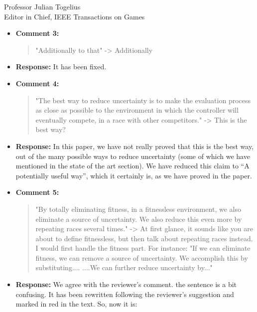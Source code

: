 \documentclass[10pt]{letter} %
\begin{document}
\begin{letter}{Professor Julian Togelius \\ Editor in Chief, IEEE Transactions on Games}
\begin{enumerate}
\begin{itemize}
	
		\item {\bf Comment 3:}
			\begin{quote}
				"Additionally to that" -> Additionally
			\end{quote}	
		\item {\bf Response:} 
			It has been fixed.
		\item {\bf Comment 4:}
			\begin{quote}
				"The best way to reduce uncertainty is to make the evaluation process as close as possible to the environment in which the controller will eventually compete, in a race with other competitors." -> This is the best way?
			\end{quote}	
		\item {\bf Response:} 
                  In this paper, we have not really proved that this
                  is the best way, out of the many possible ways to reduce
                  uncertainty (some of which we have mentioned in the
                  state of the art section). We have reduced this
                  claim to ``A potentially useful way'', which it
                  certainly is, as we have proved in the paper.
		\item {\bf Comment 5:}
			\begin{quote}
				"By totally eliminating fitness, in a fitnessless environment, we also eliminate a source of uncertainty. We also reduce this even more by repeating races several times." -> At first glance, it sounds like you are about to define fitnessless, but then talk about repeating races instead. I would first handle the fitness part. For instance: "If we can eliminate fitness, we can remove a source of uncertainty. We accomplish this by substituting.... ....We can further reduce uncertainty by..."
			\end{quote}
		\item {\bf Response:}
				We agree with the reviewer's comment. the sentence is a bit confusing. It has been rewritten following the reviewer's suggestion and marked in red in the text. So, now it is:


\end{itemize}
\end{enumerate}
\end{letter}
\end{document}
